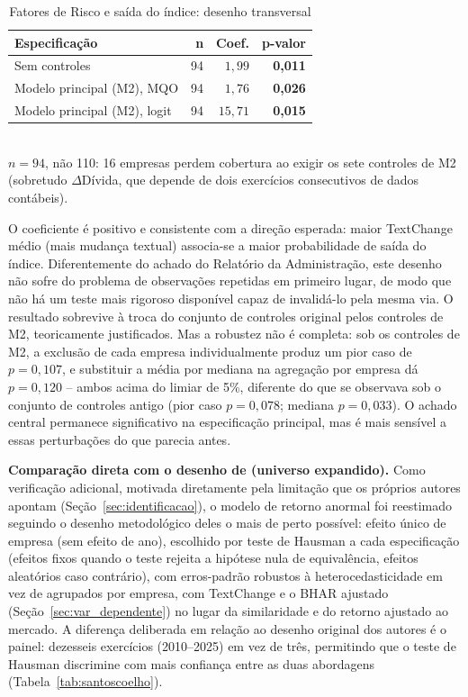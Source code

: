 \documentclass[a4paper,12pt]{report}
\begin{document}
\begin{table}[htbp]
    \centering
    \caption{Fatores de Risco e saída do índice: desenho transversal}
    \label{tab:riskfactors}
    \begin{tabular}{@{}p{6.5cm}rrr@{}}
        \toprule
        \textbf{Especificação} & \textbf{n} & \textbf{Coef.} & \textbf{p-valor} \\
        \midrule
        Sem controles                              & 94 & $1{,}99$ & \textbf{0,011} \\
        Modelo principal (M2), MQO                  & 94 & $1{,}76$ & \textbf{0,026} \\
        Modelo principal (M2), logit                & 94 & $15{,}71$ & \textbf{0,015} \\
        \bottomrule
    \end{tabular}
    \\[0.3cm]
    {\footnotesize $n=94$, não 110: 16 empresas perdem cobertura ao exigir os sete controles de M2 (sobretudo $\Delta$Dívida, que depende de dois exercícios consecutivos de dados contábeis).}
\end{table}

O coeficiente é positivo e consistente com a direção esperada: maior TextChange médio (mais mudança textual) associa-se a maior probabilidade de saída do índice. Diferentemente do achado do Relatório da Administração, este desenho não sofre do problema de observações repetidas em primeiro lugar, de modo que não há um teste mais rigoroso disponível capaz de invalidá-lo pela mesma via. O resultado sobrevive à troca do conjunto de controles original pelos controles de M2, teoricamente justificados. Mas a robustez não é completa: sob os controles de M2, a exclusão de cada empresa individualmente produz um pior caso de $p=0{,}107$, e substituir a média por mediana na agregação por empresa dá $p=0{,}120$ -- ambos acima do limiar de 5\%, diferente do que se observava sob o conjunto de controles antigo (pior caso $p=0{,}078$; mediana $p=0{,}033$). O achado central permanece significativo na especificação principal, mas é mais sensível a essas perturbações do que parecia antes.

\textbf{Comparação direta com o desenho de  (universo expandido).} Como verificação adicional, motivada diretamente pela limitação que os próprios autores apontam (Seção~\ref{sec:identificacao}), o modelo de retorno anormal foi reestimado seguindo o desenho metodológico deles o mais de perto possível: efeito único de empresa (sem efeito de ano), escolhido por teste de Hausman a cada especificação (efeitos fixos quando o teste rejeita a hipótese nula de equivalência, efeitos aleatórios caso contrário), com erros-padrão robustos à heterocedasticidade em vez de agrupados por empresa, com TextChange e o BHAR ajustado (Seção~\ref{sec:var_dependente}) no lugar da similaridade e do retorno ajustado ao mercado. A diferença deliberada em relação ao desenho original dos autores é o painel: dezesseis exercícios (2010--2025) em vez de três, permitindo que o teste de Hausman discrimine com mais confiança entre as duas abordagens (Tabela~\ref{tab:santoscoelho}).
\end{document}
